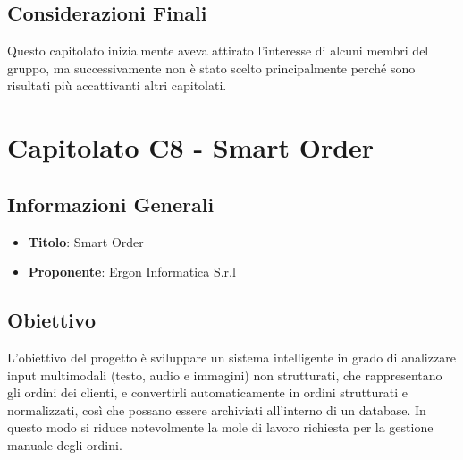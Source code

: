 \documentclass[a4paper,12pt]{article}
\begin{document}
    \subsection{Considerazioni Finali}
    Questo capitolato inizialmente aveva attirato l’interesse di alcuni membri del gruppo, ma successivamente non è stato scelto principalmente perché sono risultati più accattivanti altri capitolati.


    \section{Capitolato C8 - Smart Order}
    \subsection{Informazioni Generali}
        \begin{itemize}
            \item \textbf{Titolo}: Smart Order
            \item \textbf{Proponente}: Ergon Informatica S.r.l
        \end{itemize}
    \subsection{Obiettivo}
    L’obiettivo del progetto è sviluppare un sistema intelligente in grado di analizzare input multimodali (testo, audio e immagini) non strutturati, che rappresentano gli ordini dei clienti, e convertirli automaticamente in ordini strutturati e normalizzati, così che possano essere archiviati all’interno di un database. In questo modo si riduce notevolmente la mole di lavoro richiesta per la gestione manuale degli ordini.
\end{document}
